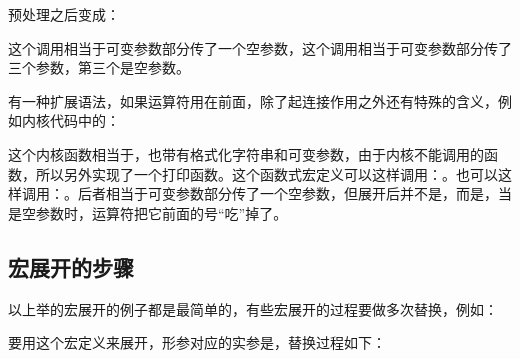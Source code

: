 

预处理之后变成：




这个调用相当于可变参数部分传了一个空参数，这个调用相当于可变参数部分传了三个参数，第三个是空参数。



有一种扩展语法，如果\BookCode{\#\#}运算符用在前面，除了起连接作用之外还有特殊的含义，例如内核代码中的：




这个内核函数相当于，也带有格式化字符串和可变参数，由于内核不能调用的函数，所以另外实现了一个打印函数。这个函数式宏定义可以这样调用：。也可以这样调用：。后者相当于可变参数部分传了一个空参数，但展开后并不是，而是，当是空参数时，\BookCode{\#\#}运算符把它前面的\BookCode{,\BookSplit{}}号“吃”掉了。


\subsection{宏展开的步骤}
%


以上举的宏展开的例子都是最简单的，有些宏展开的过程要做多次替换，例如：




要用这个宏定义来展开，形参对应的实参是，替换过程如下：


